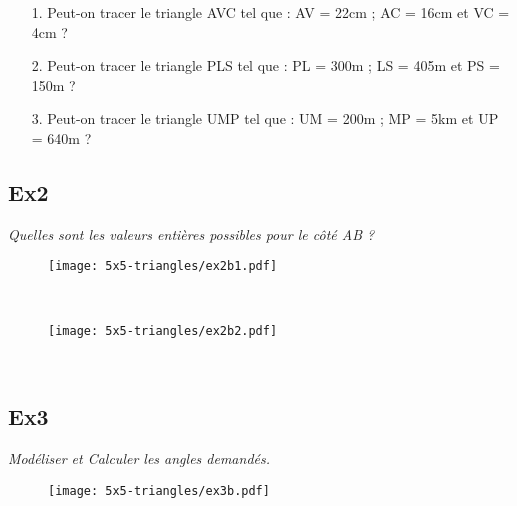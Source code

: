 \begin{enumerate}
  \item[1.] Peut-on tracer le triangle AVC tel que : AV = 22cm ; AC = 16cm et VC = 4cm ?  \\ \Pointilles[2]
  \item[2.] Peut-on tracer le triangle PLS tel que : PL = 300m ; LS = 405m et PS = 150m ?  \\ \Pointilles[2]
  \item[3.] Peut-on tracer le triangle UMP tel que : UM = 200m ; MP = 5km et UP = 640m ?   \\ \Pointilles[2]
\end{enumerate} 


\subsection*{Ex2}
\textit{Quelles sont les valeurs entières possibles pour le côté AB ?}

\begin{minipage}[t]{0.4\textwidth}
\begin{figure}[H]
  \centering
  \texttt{[image: 5x5-triangles/ex2b1.pdf]}
\end{figure}
\end{minipage}
\begin{minipage}[t]{0.6\textwidth}
  \Pointilles[8] \\
\end{minipage}

\begin{minipage}[t]{0.4\textwidth}
\begin{figure}[H]
  \centering
  \texttt{[image: 5x5-triangles/ex2b2.pdf]}
\end{figure}
\end{minipage}
\begin{minipage}[t]{0.6\textwidth}
  \Pointilles[8] \\
\end{minipage}


\subsection*{Ex3}
\textit{Modéliser et Calculer les angles demandés.}

\begin{figure}[H]
  \centering
  \texttt{[image: 5x5-triangles/ex3b.pdf]}
\end{figure}

